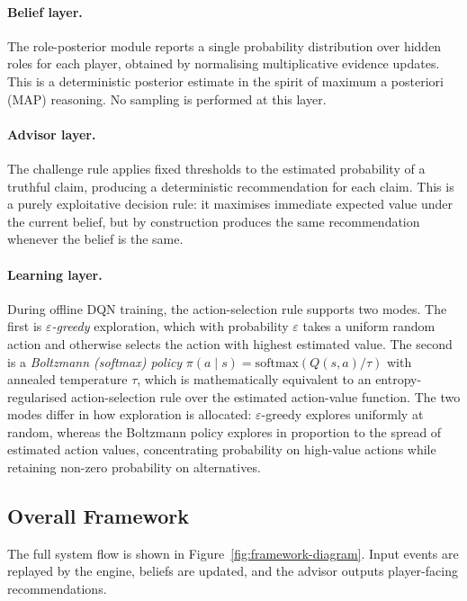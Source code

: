 \documentclass[11pt]{article}
\begin{document}
  \paragraph{Belief layer.} The role-posterior module reports a single probability distribution
  over hidden roles for each player, obtained by normalising multiplicative evidence updates.
  This is a deterministic posterior estimate in the spirit of maximum a posteriori (MAP)
  reasoning. No sampling is performed at this layer.

  \paragraph{Advisor layer.} The challenge rule applies fixed thresholds to the estimated
  probability of a truthful claim, producing a deterministic recommendation for each claim. This
   is a purely exploitative decision rule: it maximises immediate expected value under the
  current belief, but by construction produces the same recommendation whenever the belief is
  the same.

  \paragraph{Learning layer.} During offline DQN training, the action-selection rule supports
  two modes. The first is \textit{$\varepsilon$-greedy} exploration, which with probability
  $\varepsilon$ takes a uniform random action and otherwise selects the action with highest
  estimated value. The second is a \textit{Boltzmann (softmax) policy} $\pi(a \mid s) =
  \mathrm{softmax}(Q(s,a)/\tau)$ with annealed temperature $\tau$, which is mathematically
  equivalent to an entropy-regularised action-selection rule over the estimated action-value
  function. The two modes differ in how exploration is allocated: $\varepsilon$-greedy explores
  uniformly at random, whereas the Boltzmann policy explores in proportion to the spread of
  estimated action values, concentrating probability on high-value actions while retaining
  non-zero probability on alternatives.

\subsection{Overall Framework}
The full system flow is shown in Figure~\ref{fig:framework-diagram}. Input events are replayed by the engine, beliefs are updated, and the advisor outputs player-facing recommendations.
\end{document}
